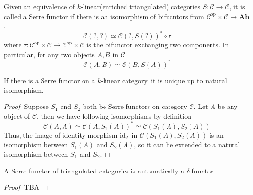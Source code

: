 Given an equivalence of $k$-linear(enriched triangulated) categories $S: \mathcal{C} \rightarrow \mathcal{C}$, it is called a Serre functor if there is an isomorphism of bifucntors from $ \mathcal{C}^{\text{op}} \times \mathcal{C} \rightarrow \mathbf{Ab}$.
\[
\mathcal{C}(?,?) \simeq \mathcal{C}(?,S(?))^{*} \circ \tau
\]
where $\tau: \mathcal{C}^{\text{op}} \times \mathcal{C} \rightarrow \mathcal{C}^{\text{op}} \times \mathcal{C}$ is the bifunctor  exchanging two components. In particular, for any two objects $A,B$ in $\mathcal{C}$,
\[
\mathcal{C}(A,B) \simeq \mathcal{C}(B,S(A))^{*}
\]

\begin{prop}
If there is a Serre functor on a $k$-linear category, it is unique up to natural isomorphism.
\end{prop}
\begin{proof}
Suppose $S_1$ and $S_2$ both be Serre functors on category $\mathcal{C}$. Let $A$ be any object of $\mathcal{C}$. then we have following isomorphisms by definition
\[
\mathcal{C}(A,A) \simeq \mathcal{C}(A, S_1(A))^{*} \simeq \mathcal{C}(S_1(A),S_2(A))
\]
Thus, the image of identity morphism $\text{id}_A$ in $\mathcal{C}(S_1(A),S_2(A))$ is an isomorphism between $S_1(A)$ and $S_2(A)$, so it can be extended to a natural isomorphism between $S_1$ and $S_2$.
\end{proof}

\begin{prop}
A Serre functor of triangulated categories is automatically a $\delta $-functor.
\end{prop}
\begin{proof}
TBA
\end{proof}